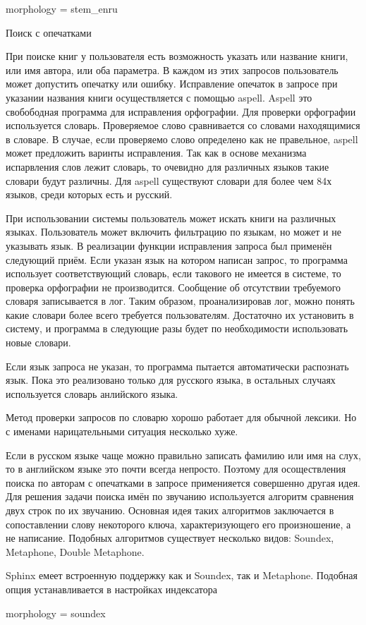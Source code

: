 morphology = stem\_enru


Поиск с опечатками

При поиске книг у пользователя есть возможность указать или название книги, или имя автора, или оба параметра. В каждом из этих запросов пользователь может допустить опечатку или ошибку.
Исправление опечаток в запросе при указании названия книги осуществляется с помощью aspell. 
Aspell это свобободная программа для исправления орфографии.
Для проверки орфографии используется словарь. 
Проверяемое слово сравнивается со словами находящимися в словаре.
В случае, если проверяемо слово определено как не правельное, aspell может предложить варинты исправления. Так как в основе механизма испарвления слов лежит словарь, то очевидно для различных языков такие словари будут различны. Для aspell существуют словари для более чем 84х языков,
среди которых есть и русский.

При использовании системы пользователь может искать книги на различных языках. Пользователь может включить фильтрацию по языкам, но может и не указывать язык.
В реализации функции исправления запроса был применён следующий приём.
Если указан язык на котором написан запрос, то программа использует соответствующий словарь, если такового не имеется в системе, то проверка орфографии не производится. Сообщение об отсутствии требуемого словаря записывается в лог.
Таким образом, проанализировав лог, можно понять какие словари более всего требуется пользователям. Достаточно их установить в систему, и программа в следующие разы будет по необходимости использовать новые словари.

Если язык запроса не указан, то программа пытается автоматически распознать язык.
Пока это реализовано только для русского языка, в остальных случаях используется словарь анлийского языка.

Метод проверки запросов по словарю хорошо работает для обычной лексики. Но с именами нарицательными ситуация несколько хуже.

Если в русском языке чаще можно правильно записать фамилию или имя на слух, то в английском языке это почти всегда непросто.
Поэтому для осоществления поиска по авторам с опечатками в запросе применияется совершенно другая идея.
Для решения задачи поиска имён по звучанию используется алгоритм сравнения двух строк по их звучанию.
Основная идея таких алгоритмов заключается в сопоставлении слову некоторого ключа, характеризующего его произношение, а не написание.
Подобных алгоритмов существует несколько видов: Soundex, Metaphone, Double Metaphone.

Sphinx емеет встроенную поддержку как и Soundex, так и Metaphone. Подобная опция устанавливается в настройках индексатора

morphology = soundex










